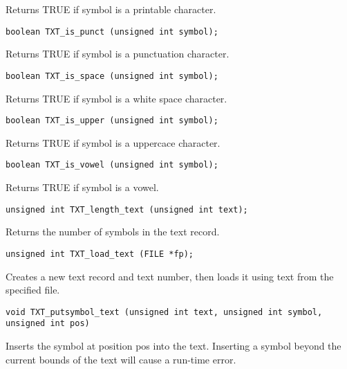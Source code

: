 \documentclass[11pt]{article}
\begin{document}
{\vspace{-0.2cm}
Returns TRUE if symbol is a printable character.

\begin{verbatim}
boolean TXT_is_punct (unsigned int symbol);
\end{verbatim}

\vspace{-0.2cm}
Returns TRUE if symbol is a punctuation character.

\begin{verbatim}
boolean TXT_is_space (unsigned int symbol);
\end{verbatim}

\vspace{-0.2cm}
Returns TRUE if symbol is a white space character.

\begin{verbatim}
boolean TXT_is_upper (unsigned int symbol);
\end{verbatim}

\vspace{-0.2cm}
Returns TRUE if symbol is a uppercace character.

\begin{verbatim}
boolean TXT_is_vowel (unsigned int symbol);
\end{verbatim}

\vspace{-0.2cm}
Returns TRUE if symbol is a vowel.

\begin{verbatim}
unsigned int TXT_length_text (unsigned int text);
\end{verbatim}

\vspace{-0.2cm}
Returns the number of symbols in the text record.

\begin{verbatim}
unsigned int TXT_load_text (FILE *fp);
\end{verbatim}

\vspace{-0.2cm}
Creates a new text record and text number, then loads it using text from the specified file.

\begin{verbatim}
void TXT_putsymbol_text (unsigned int text, unsigned int symbol, unsigned int pos)
\end{verbatim}

\vspace{-0.2cm}
Inserts the symbol at position pos into the text. Inserting a symbol beyond
the current bounds of the text will cause a run-time error.

}
\end{document}
